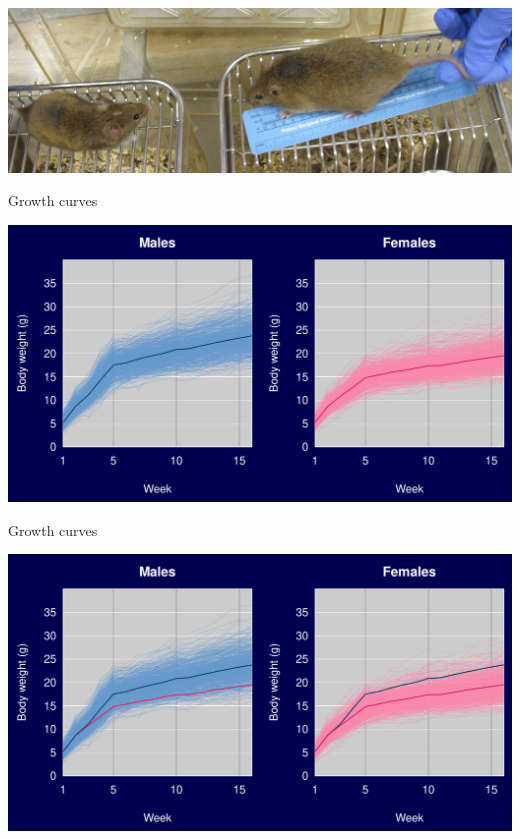 \documentclass[12pt]{article}
\newcommand{\headsize}{\fontsize{35}{35} \selectfont}
\begin{document}
\centerline{\includegraphics[width=\textwidth]{Figs/wsb_508_and_gough_535_cropped.jpg}}


\newpage

\headsize \color{myyellow}
\hfill \begin{minipage}{5.75in}
\centering
Growth curves
\end{minipage}

\vspace{30mm}

\centerline{\includegraphics{Figs/growth1.pdf}}


\newpage

\addtocounter{page}{-1}

\headsize \color{myyellow}
\hfill \begin{minipage}{5.75in}
\centering
Growth curves
\end{minipage}

\vspace{30mm}

\centerline{\includegraphics{Figs/growth2.pdf}}
\end{document}
